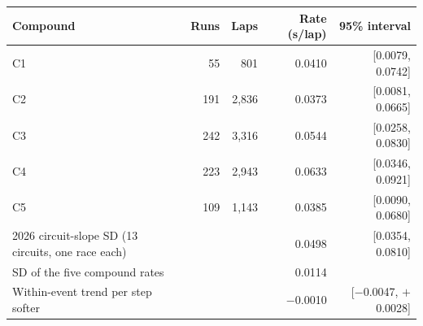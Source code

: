 \begin{tabular}{@{}lrrrr@{}}
\toprule
Compound & Runs & Laps & Rate (s/lap) & 95\% interval \\
\midrule
C1 & 55 & 801 & 0.0410 & [0.0079, 0.0742] \\
C2 & 191 & 2{,}836 & 0.0373 & [0.0081, 0.0665] \\
C3 & 242 & 3{,}316 & 0.0544 & [0.0258, 0.0830] \\
C4 & 223 & 2{,}943 & 0.0633 & [0.0346, 0.0921] \\
C5 & 109 & 1{,}143 & 0.0385 & [0.0090, 0.0680] \\
\midrule
2026 circuit-slope SD (13 circuits, one race each) &  &  & 0.0498 & [0.0354, 0.0810] \\
SD of the five compound rates &  &  & 0.0114 &  \\
Within-event trend per step softer &  &  & \ensuremath{-}0.0010 & [\ensuremath{-}0.0047, \ensuremath{+}0.0028] \\
\bottomrule
\end{tabular}
